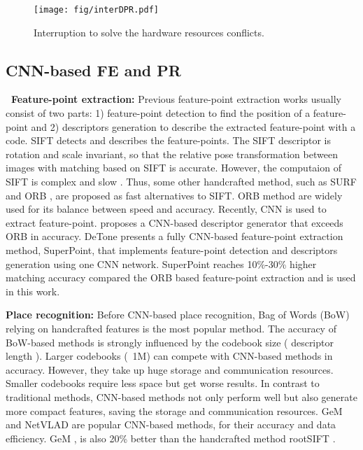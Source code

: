 
\label{sec:relate}


\begin{figure*}[t]
	\centering
	\texttt{[image: fig/interDPR.pdf]}
    \caption{Interruption to solve the hardware resources conflicts.  
    }
	\label{fig:interDPR}
\end{figure*}


\subsection{ CNN-based FE and PR }

\textbf{\quad \ Feature-point extraction:} Previous feature-point extraction works usually consist of two parts: 1) feature-point detection to find the position of a feature-point and 2) descriptors generation to describe the extracted feature-point with a code.
SIFT \cite{lowe2004distinctive}  detects and describes the feature-points. The SIFT descriptor is rotation and scale invariant, so that the relative pose transformation between images with matching based on SIFT is accurate. However, the computaion of SIFT is complex and slow \cite{bay2006surf}. Thus, some other handcrafted method, such as SURF\cite{bay2006surf} and ORB \cite{Mur-Artal:2017281}, are proposed as fast alternatives to SIFT. ORB \cite{Mur-Artal:2017281} method are widely used for its balance between speed and accuracy.
Recently, CNN is used to extract feature-point. \cite{simo2015discriminative} proposes a CNN-based descriptor generator that exceeds ORB in accuracy.
DeTone \cite{detone2018superpoint} presents a fully CNN-based feature-point extraction method, SuperPoint, that implements feature-point detection and descriptors generation using one CNN network. SuperPoint\cite{detone2018superpoint} reaches 10\%-30\% higher matching accuracy compared the ORB based feature-point extraction \cite{Mur-Artal:2017281} and is used in this work.

\textbf{Place recognition:} Before CNN-based place recognition, Bag of Words (BoW) \cite{small_1} relying on handcrafted features is the most popular method. The accuracy of BoW-based methods is strongly influenced by the codebook size ( descriptor length ). Larger codebooks (~1M) \cite{large_1, large_2} can compete with CNN-based methods in accuracy. However, they take up huge storage and communication resources. Smaller codebooks\cite{small_1, small_2, jegou2014triang} require less space but get worse results. In contrast to traditional methods, CNN-based methods not only perform well but also generate more compact features, saving the storage and communication resources. GeM \cite{radenovic2018fine} and NetVLAD \cite{arandjelovic2016netvlad} are popular CNN-based methods, for their accuracy and data efficiency. GeM \cite{radenovic2018fine}, is also 20\% better than the handcrafted method rootSIFT \cite{jegou2014triang}.

